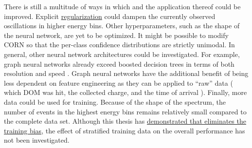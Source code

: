 There is still a multitude of ways in which \dsea{} and the application thereof could be improved.
%
Explicit \hyperref[sec:dsea:deconvolution_problem:regularization]{regularization}
could dampen the currently observed oscillations in higher energy bins.
%
Other hyperparameters,
  such as the shape of the neural network,
are yet to be optimized.
%
It might be possible to modify \ac{CORN}
  so that the per-class confidence distributions are strictly unimodal.
In general,
other neural network architectures
  could be investigated.
For example,
  graph neural networks
  already exceed boosted decision trees
    in terms of both resolution and speed \cite{minh2021gnn}.
%
Graph neural networks
have the additional benefit of
being less dependent on feature engineering
  as they can be applied to \enquote{raw} data
    (%
      which \ac{DOM} was hit,
      the collected charge, %
      and the time of arrival%
    ).
%
Finally,
  more data could be used for training.
Because of the shape of the spectrum,
  the number of events in the highest energy bins
  remains relatively small
    compared to the complete data set.
Although this thesis has \hyperref[sec:unfolding:bias]{demonstrated that \dsea{} eliminates the training bias},
  the effect of stratified training data on the overall performance
  has not been investigated.


